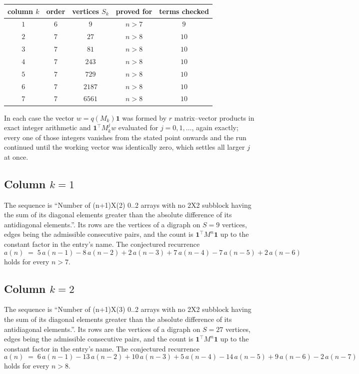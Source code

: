 \documentclass[11pt,a4paper]{article}
\theoremstyle{plain}
\theoremstyle{definition}
\begin{document}
\begin{center}
\begin{tabular}{ccccc}
column $k$ & order & vertices $S_k$ & proved for & terms checked \\ \hline
$1$ & $6$ & $9$ & $n>7$ & $9$ \\
$2$ & $7$ & $27$ & $n>8$ & $10$ \\
$3$ & $7$ & $81$ & $n>8$ & $10$ \\
$4$ & $7$ & $243$ & $n>8$ & $10$ \\
$5$ & $7$ & $729$ & $n>8$ & $10$ \\
$6$ & $7$ & $2187$ & $n>8$ & $10$ \\
$7$ & $7$ & $6561$ & $n>8$ & $10$ \\
\end{tabular}
\end{center}

In each case the vector $w=q(M_k)\mathbf{1}$ was formed by $r$ matrix--vector products in
exact integer arithmetic and $\mathbf{1}^{\!\top}M_k^{j}w$ evaluated for $j=0,1,\dots$,
again exactly; every one of those integers vanishes from the stated point onwards and the run
continued until the working vector was identically zero, which settles all larger $j$ at once.

\subsection*{Column $k=1$}
The sequence is ``Number of (n+1)X(2) 0..2 arrays with no 2X2 subblock having the sum of its diagonal elements greater than the absolute difference of its antidiagonal elements.''. Its rows are the vertices of a digraph on
$S=9$ vertices, edges being the admissible consecutive pairs, and the count is
$\mathbf{1}^{\!\top}M^{n}\mathbf{1}$ up to the constant factor in the entry's name.
The conjectured recurrence
\[
a(n)\;=\;5\,a(n-1) - 8\,a(n-2) + 2\,a(n-3) + 7\,a(n-4) - 7\,a(n-5) + 2\,a(n-6)
\]
holds for every $n>7$.

\subsection*{Column $k=2$}
The sequence is ``Number of (n+1)X(3) 0..2 arrays with no 2X2 subblock having the sum of its diagonal elements greater than the absolute difference of its antidiagonal elements.''. Its rows are the vertices of a digraph on
$S=27$ vertices, edges being the admissible consecutive pairs, and the count is
$\mathbf{1}^{\!\top}M^{n}\mathbf{1}$ up to the constant factor in the entry's name.
The conjectured recurrence
\[
a(n)\;=\;6\,a(n-1) - 13\,a(n-2) + 10\,a(n-3) + 5\,a(n-4) - 14\,a(n-5) + 9\,a(n-6) - 2\,a(n-7)
\]
holds for every $n>8$.
\end{document}
